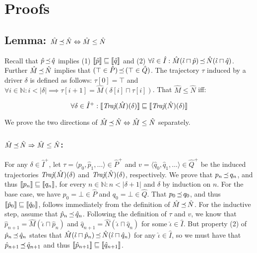 \section{Proofs}

\subsection{Lemma: $\hat M \operatorname{\mathrel{\preceq}} \hat N \Leftrightarrow \hat M \leq \hat N$}

Recall that $\hat p \operatorname{\mathrel{\preceq}} \hat q$ implies (1) $\llbracket\hat p\rrbracket \sqsubseteq \llbracket\hat q\rrbracket$ and (2) $\forall \hat \iota \in \hat I : \hat M(\hat \iota \sqcap \hat p) \operatorname{\mathrel{\preceq}} \hat N(\hat \iota \sqcap \hat q)$. Further $\hat M \operatorname{\mathrel{\preceq}} \hat N$ implies that $(\top \in \hat P) \operatorname{\mathrel{\preceq}} \, (\top \in \hat Q)$. The trajectory $\tau$ induced by a driver $\delta$ is defined as follows: $\tau[0] = \top$ and $\forall i \in \mathbb{N} : i < | \delta | \implies \tau[i+1] = \hat M(\delta[i] \sqcap \tau[i])$. That $\hat M \leq \hat N$ iff:

\begin{equation*}
\forall \delta \in \hat I^{+} : \llbracket\textit{Traj}(\hat M)(\delta)\rrbracket \sqsubseteq \llbracket\textit{Traj}(\hat N)(\delta)\rrbracket
\end{equation*}

We prove the two directions of $\hat M \operatorname{\mathrel{\preceq}} \hat N \Leftrightarrow \hat M \leq \hat N$ separately.

\subsubsection{$\hat M \operatorname{\mathrel{\preceq}} \hat N \Rightarrow \hat M \leq \hat N$:} For any $\delta \in \hat I^{+}$, let $\tau = \langle \hat p_{0}, \hat p_{1}, \ldots \rangle \in \hat P^{+}$ and $v = \langle \hat q_{0}, \hat q_{1}, \dots \rangle \in \hat Q^{+}$ be the induced trajectories $\textit{Traj}(\hat M)(\delta)$ and $\textit{Traj}(\hat N)(\delta)$, respectively. We prove that $p_{n} \operatorname{\mathrel{\preceq}} q_{n}$, and thus $\llbracket p_{n}\rrbracket \sqsubseteq \llbracket q_{n}\rrbracket$, for every $n \in \mathbb{N} : n < | \delta + 1 |$ and $\delta$ by induction on $n$. For the base case, we have $p_{0} = \bot \in \hat P$ and $q_{0} = \bot \in \hat Q$. That $p_{0} \operatorname{\mathrel{\preceq}} q_{0}$, and thus $\llbracket\hat p_{0}\rrbracket \sqsubseteq \llbracket\hat q_{0}\rrbracket$, follows immediately from the definition of $\hat M \operatorname{\mathrel{\preceq}} \hat N$. For the inductive step, assume that $\hat p_{n} \operatorname{\mathrel{\preceq}} \hat q_{n}$. Following the definition of $\tau$ and $v$, we know that $\hat p_{n+1} = \hat M(\hat \iota \sqcap \hat p_{n})$ and $\hat q_{n+1} = \hat N(\hat \iota \sqcap \hat q_{n})$ for some $\hat \iota \in \hat I$. But property (2) of $\hat p_{n} \operatorname{\mathrel{\preceq}} \hat q_{n}$ states that $\hat M(\hat \iota \sqcap \hat p_{n}) \operatorname{\mathrel{\preceq}} \hat N(\hat \iota \sqcap \hat q_{n})$ for any $\hat \iota \in \hat I$, so we must have that $\hat p_{n+1} \operatorname{\mathrel{\preceq}} \hat q_{n+1}$ and thus $\llbracket\hat p_{n+1}\rrbracket \sqsubseteq \llbracket\hat q_{n+1}\rrbracket$.

